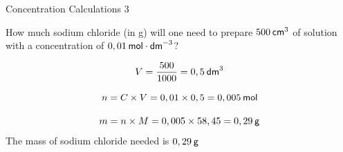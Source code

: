       \begin{wex}{Concentration Calculations 3 }
{
\label{m38712*id283476}How much sodium chloride (in g) will one need to prepare $500\phantom{\rule{2pt}{0ex}}{\mathsf{cm}}^{3}$ of solution with a concentration of $0,01\phantom{\rule{2pt}{0ex}}\mathsf{mol}\cdot \mathsf{dm}^{-3}$?\par 
      \vspace{5pt} }
{
    \begin{equation*}
    V=\frac{500}{1 000}=0,5\phantom{\rule{2pt}{0ex}}{\mathsf{dm}}^{3}
      \end{equation*}
      \label{m38712*id283565}\nopagebreak\noindent{}
        
    \begin{equation*}
    n=C\ensuremath{\times}V=0,01\ensuremath{\times}0,5=0,005\phantom{\rule{2pt}{0ex}}\mathsf{mol}
      \end{equation*}
      \label{m38712*id283636}\nopagebreak\noindent{}
        
    \begin{equation*}
    m=n\ensuremath{\times}M=0,005\ensuremath{\times}58,45=0,29\phantom{\rule{2pt}{0ex}}\mathsf{g}
      \end{equation*}
      \label{m38712*id283684}The mass of sodium chloride needed is $0,29\phantom{\rule{2pt}{0ex}}\mathsf{g}$
 \par 
}
    \end{wex}
    \noindent
\label{m38712*secfhsst!!!underscore!!!id1879}
